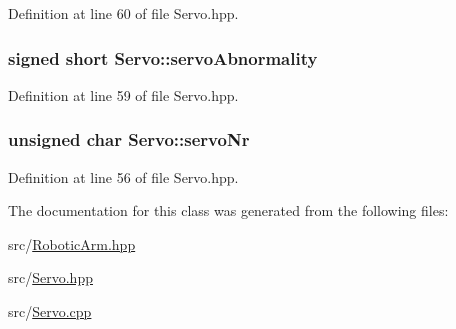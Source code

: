 Definition at line 60 of file Servo.\+hpp.

\subsubsection[{\texorpdfstring{servo\+Abnormality}{servoAbnormality}}]{\setlength{\rightskip}{0pt plus 5cm}signed short Servo\+::servo\+Abnormality\hspace{0.3cm}{\ttfamily [private]}}\hypertarget{struct_servo_a0876d7d53f6e32cd75fa8ead3c274ead}{}\label{struct_servo_a0876d7d53f6e32cd75fa8ead3c274ead}


Definition at line 59 of file Servo.\+hpp.

\subsubsection[{\texorpdfstring{servo\+Nr}{servoNr}}]{\setlength{\rightskip}{0pt plus 5cm}unsigned char Servo\+::servo\+Nr\hspace{0.3cm}{\ttfamily [private]}}\hypertarget{struct_servo_a0795bd3f3c8d44e1818ffd653a7484d5}{}\label{struct_servo_a0795bd3f3c8d44e1818ffd653a7484d5}


Definition at line 56 of file Servo.\+hpp.



The documentation for this class was generated from the following files\+:\begin{DoxyCompactItemize}
\item 
src/\hyperlink{_robotic_arm_8hpp}{Robotic\+Arm.\+hpp}\item 
src/\hyperlink{_servo_8hpp}{Servo.\+hpp}\item 
src/\hyperlink{_servo_8cpp}{Servo.\+cpp}\end{DoxyCompactItemize}
